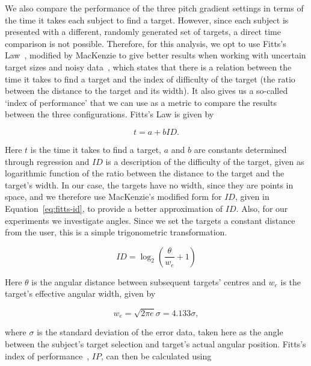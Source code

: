 \documentclass[format=sigconf, review=true, screen=true, anonymous=true]{acmart}
\begin{document}
We also compare the performance of the three pitch gradient settings in terms of the time it takes each subject to find a target. However, since each subject is presented with a different, randomly generated set of targets, a direct time comparison is not possible. Therefore, for this analysis, we opt to use Fitts's Law~\cite{fitts1954information}, modified by MacKenzie to give better results when working with uncertain target sizes and noisy data~\cite{mackenzie1992fitts}, which states that there is a relation between the time it takes to find a target and the index of difficulty of the target (the ratio between the distance to the target and its width). It also gives us a so-called `index of performance' that we can use as a metric to compare the results between the three configurations. Fitts's Law is given by  

\begin{equation}
  \label{eq:fitts-base}
  t = a + bID.%
\end{equation}

Here $t$ is the time it takes to find a target, $a$ and $b$ are constants determined through regression and $ID$ is a description of the difficulty of the target, given as logarithmic function of the ratio between the distance to the target and the target's width. In our case, the targets have no width, since they are points in space, and we therefore use MacKenzie's modified form for $ID$, given in Equation~\ref{eq:fitts-id}, to provide a better approximation of $ID$. Also, for our experiments we investigate angles. Since we set the targets a constant distance from the user, this is a simple trigonometric transformation.

\begin{equation}
  \label{eq:fitts-id}
  ID = \log_2\left(\frac{\theta}{w_e} + 1\right)
\end{equation}

Here $\theta$ is the angular distance between subsequent targets' centres and $w_e$ is the target's effective angular width, given by

\begin{equation}
  \label{eq:fitts-we}
  w_e = \sqrt{2\pi e}\sigma = 4.133\sigma,
\end{equation}

\noindent
where $\sigma$ is the standard deviation of the error data, taken here as the angle between the subject's target selection and target's actual angular position. Fitts's index of performance~\cite[p.~390]{fitts1954information}, $IP$, can then be calculated using 
\end{document}
